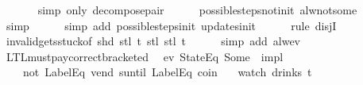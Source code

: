 \begin{isabellebody}
\isanewline
\ \ \ \ \ \isamarkupfalse%
\ {\isacharparenleft}simp\ only{\isacharcolon}\ decompose{\isacharunderscore}pair{\isacharparenright}\isanewline
\ \ \ \ \isamarkupfalse%
\ possible{\isacharunderscore}steps{\isacharunderscore}not{\isacharunderscore}init\ alw{\isacharunderscore}not{\isacharunderscore}some\isanewline
\ \ \ \ \ \isamarkupfalse%
\ simp\isanewline
\ \ \ \ \isamarkupfalse%
\ {\isacharparenleft}simp\ add{\isacharcolon}\ possible{\isacharunderscore}steps{\isacharunderscore}init\ updates{\isacharunderscore}init{\isacharparenright}\isanewline
\ \ \ \ \isamarkupfalse%
\ {\isacharparenleft}rule\ disjI{}{\isacharparenright}\isanewline
\ \ \ \ \isamarkupfalse%
\ invalid{\isacharunderscore}gets{\isacharunderscore}stuck{\isacharbrackleft}of\ {\isachardoublequoteopen}shd\ {\isacharparenleft}stl\ t{\isacharparenright}{\isachardoublequoteclose}\ {\isachardoublequoteopen}stl\ {\isacharparenleft}stl\ t{\isacharparenright}{\isachardoublequoteclose}{\isacharbrackright}\isanewline
\ \ \ \ \isamarkupfalse%
\ {\isacharparenleft}simp\ add{\isacharcolon}\ alw{\isacharunderscore}ev{\isacharparenright}\isanewline
{}\isamarkupfalse%
%
\endisatagproof
{\isafoldproof}%
%
\isadelimproof
\isanewline
%
\endisadelimproof
\isanewline
\isanewline
{}\isamarkupfalse%
\ LTL{\isacharunderscore}must{\isacharunderscore}pay{\isacharunderscore}correct{\isacharunderscore}bracketed{\isacharcolon}\isanewline
\ \ {\isachardoublequoteopen}{\isacharparenleft}{\isacharparenleft}ev\ {\isacharparenleft}StateEq\ {\isacharparenleft}Some\ {}{\isacharparenright}{\isacharparenright}{\isacharparenright}\ impl\isanewline
\ \ \ \ {\isacharparenleft}{\isacharparenleft}not\ {\isacharparenleft}LabelEq\ {\isacharprime}{\isacharprime}vend{\isacharprime}{\isacharprime}{\isacharparenright}{\isacharparenright}\ suntil\ LabelEq\ {\isacharprime}{\isacharprime}coin{\isacharprime}{\isacharprime}{\isacharparenright}{\isacharparenright}\isanewline
\ \ \ {\isacharparenleft}watch\ drinks\ t{\isacharparenright}{\isachardoublequoteclose}\isanewline
%
\isadelimproof
\ \ %
\endisadelimproof
%
\isatagproof
{}\isamarkupfalse%
%
\endisatagproof
{\isafoldproof}%
%
\isadelimproof
%
\endisadelimproof
%
\end{isabellebody}
